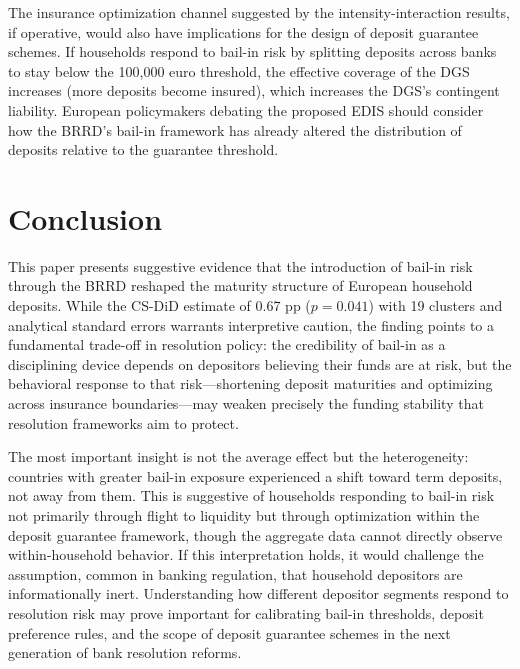 \documentclass[12pt]{article}
\begin{document}
The insurance optimization channel suggested by the intensity-interaction results, if operative, would also have implications for the design of deposit guarantee schemes. If households respond to bail-in risk by splitting deposits across banks to stay below the 100{,}000 euro threshold, the effective coverage of the DGS increases (more deposits become insured), which increases the DGS's contingent liability. European policymakers debating the proposed EDIS should consider how the BRRD's bail-in framework has already altered the distribution of deposits relative to the guarantee threshold.


\section{Conclusion}

This paper presents suggestive evidence that the introduction of bail-in risk through the BRRD reshaped the maturity structure of European household deposits. While the CS-DiD estimate of 0.67 pp ($p = 0.041$) with 19 clusters and analytical standard errors warrants interpretive caution, the finding points to a fundamental trade-off in resolution policy: the credibility of bail-in as a disciplining device depends on depositors believing their funds are at risk, but the behavioral response to that risk---shortening deposit maturities and optimizing across insurance boundaries---may weaken precisely the funding stability that resolution frameworks aim to protect.

The most important insight is not the average effect but the heterogeneity: countries with greater bail-in exposure experienced a shift toward term deposits, not away from them. This is suggestive of households responding to bail-in risk not primarily through flight to liquidity but through optimization within the deposit guarantee framework, though the aggregate data cannot directly observe within-household behavior. If this interpretation holds, it would challenge the assumption, common in banking regulation, that household depositors are informationally inert. Understanding how different depositor segments respond to resolution risk may prove important for calibrating bail-in thresholds, deposit preference rules, and the scope of deposit guarantee schemes in the next generation of bank resolution reforms.
\end{document}
